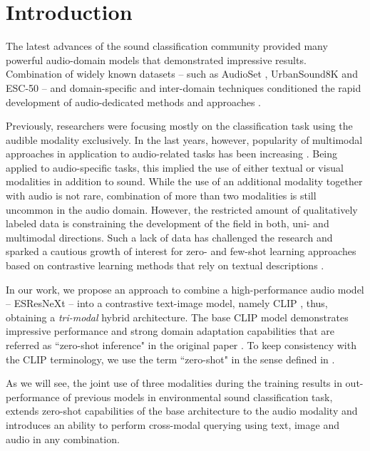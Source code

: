 \documentclass[runningheads]{llncs}
\begin{document}
\section{Introduction} \label{sec:intro}
The latest advances of the sound classification community provided many powerful audio-domain models that demonstrated impressive results.
Combination of widely known datasets -- such as \mbox{AudioSet} \cite{gemmeke2017audioset}, \mbox{UrbanSound8K} \cite{salamon2014us8k} and \mbox{ESC-50} \cite{piczak2015esc} -- and domain-specific and inter-domain techniques conditioned the rapid development of audio-dedicated methods and approaches \cite{kumar2020weanet,guzhov2021esrnx,verbitskiy2021erann}.

Previously, researchers were focusing mostly on the classification task using the audible modality exclusively.
In the last years, however, popularity of multimodal approaches in application to audio-related tasks has been increasing \cite{kim2019audiocaps,alayrac2020versatile,zhang2021sscl}.
Being applied to audio-specific tasks, this implied the use of either textual or visual modalities in addition to sound.
While the use of an additional modality together with audio is not rare, combination of more than two modalities is still uncommon in the audio domain.
However, the restricted amount of qualitatively labeled data is constraining the development of the field in both, uni- and multimodal directions.
Such a lack of data has challenged the research and sparked a cautious growth of interest for zero- and few-shot learning approaches based on contrastive learning methods that rely on textual descriptions \cite{islam2019soundsemantics,xie2019zero,xie2021zero}.

In our work, we propose an approach to combine a high-performance audio model -- \mbox{ESResNeXt} \cite{guzhov2021esrnx} -- into a contrastive text-image model, namely \mbox{CLIP} \cite{radford2021clip}, thus, obtaining a \emph{tri-modal} hybrid architecture.
The base \mbox{CLIP} model demonstrates impressive performance and strong domain adaptation capabilities that are referred as ``zero-shot inference" in the original paper \cite{radford2021clip}.
To keep consistency with the \mbox{CLIP} terminology, we use the term ``zero-shot" in the sense defined in \cite{radford2021clip}.

As we will see, the joint use of three modalities during the training results in out-performance of previous models in environmental sound classification task, extends zero-shot capabilities of the base architecture to the audio modality and introduces an ability to perform cross-modal querying using text, image and audio in any combination.
\end{document}
